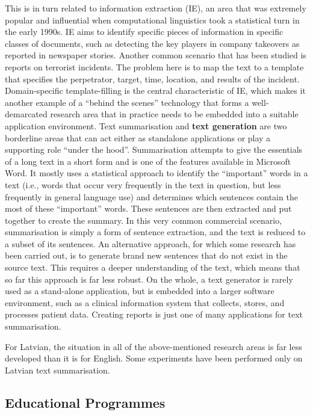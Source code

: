 \begin{multicols}{2}
This is in turn related to information extraction (IE), an area that was extremely popular and influential when computational linguistics took a statistical turn in the early 1990s.
IE aims to identify specific pieces of information in specific classes of documents, such as detecting the key players in company takeovers as reported in newspaper stories.
Another common scenario that has been studied is reports on terrorist incidents.
The problem here is to map the text to a template that specifies the perpetrator, target, time, location, and results of the incident.
Domain-specific template-filling is the central characteristic of IE, which makes it another example of a ``behind the scenes'' technology that forms a well-demarcated research area that in practice needs to be embedded into a suitable application environment. 
Text summarisation and \textbf{text generation} are two borderline areas that can act either as standalone applications or play a supporting role ``under the hood''.
Summarisation attempts to give the essentials of a long text in a short form and is one of the features available in Microsoft Word.
It mostly uses a statistical approach to identify the ``important'' words in a text (i.e., words that occur very frequently in the text in question, but less frequently in general language use) and determines which sentences contain the most of these ``important'' words.
These sentences are then extracted and put together to create the summary.
In this very common commercial scenario, summarisation is simply a form of sentence extraction, and the text is reduced to a subset of its sentences.
An alternative approach, for which some research has been carried out, is to generate brand new sentences that do not exist in the source text.
This requires a deeper understanding of the text, which means that so far this approach is far less robust.
On the whole, a text generator is rarely used as a stand-alone application, but is embedded into a larger software environment, such as a clinical information system that collects, stores, and processes patient data.
Creating reports is just one of many applications for text summarisation. 

For Latvian, the situation in all of the above-mentioned research areas is far less developed than it is for English.
Some experiments have been performed only on Latvian text summarisation.

\subsection{Educational Programmes}


\end{multicols}
